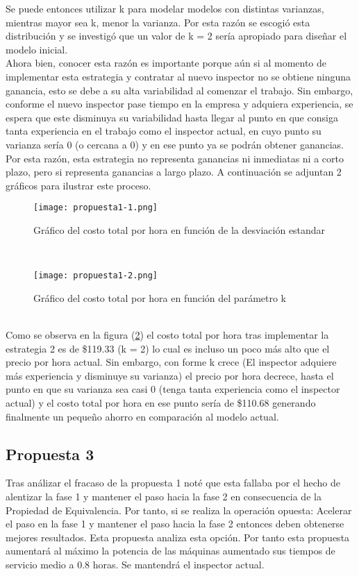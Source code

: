 \documentclass{article}
\begin{document}
Se puede entonces utilizar k para modelar modelos con distintas varianzas, mientras
mayor sea k, menor la varianza. Por esta razón se escogió esta distribución 
y se investigó que un valor de k = 2 sería apropiado para diseñar el modelo 
inicial.\\
Ahora bien, conocer esta razón es importante porque aún si al momento de implementar
esta estrategia y contratar al nuevo inspector no se obtiene ninguna ganancia, esto
se debe a su alta variabilidad al comenzar el trabajo. Sin embargo, conforme 
el nuevo inspector pase tiempo en la empresa y adquiera experiencia, se espera
que este disminuya su variabilidad hasta llegar al punto en que consiga tanta
experiencia en el trabajo como el inspector actual, en cuyo punto su varianza 
sería 0 (o cercana a 0) y en ese punto ya se podrán obtener ganancias. 
Por esta razón, esta estrategia no representa ganancias ni inmediatas ni a corto plazo,
pero si representa ganancias a largo plazo. A continuación se adjuntan 2 gráficos 
para ilustrar este proceso.\\
\begin{figure}[h]
\begin{center}
	\texttt{[image: propuesta1-1.png]}
		 \caption{Gráfico del costo total por hora en función de la desviación estandar}
\label{fig1:propuesta11}
\end{center}
\end{figure}	\\
\begin{figure}[h]
\begin{center}
	\texttt{[image: propuesta1-2.png]}
		 \caption{Gráfico del costo total por hora en función del parámetro k}
\label{fig2:propuesta12}
\end{center}
\end{figure} \\
Como se observa en la figura (\ref{fig2:propuesta12}) el costo total por hora
tras implementar la estrategia 2 es de \$119.33 (k = 2) lo cual es incluso
un poco más alto
que el precio por hora actual. Sin embargo, con forme k crece (El inspector adquiere
más experiencia y disminuye su varianza) el precio por hora decrece, hasta el 
punto en que su varianza sea casi 0 (tenga tanta experiencia como el inspector 
actual) y el costo total por hora en ese punto sería de \$110.68 generando 
finalmente un pequeño ahorro en comparación al modelo actual.
\subsection{Propuesta 3}
Tras análizar el fracaso de la propuesta 1 noté que esta fallaba por el hecho
de alentizar la fase 1 y mantener el paso hacia la fase 2 en consecuencia de la
Propiedad de Equivalencia. Por tanto, si se realiza la operación opuesta: 
Acelerar el paso en la fase 1 y mantener el paso hacia la fase 2 entonces 
deben obtenerse mejores resultados. Esta propuesta analiza esta opción.
Por tanto esta propuesta aumentará al máximo la potencia de las máquinas aumentado
sus tiempos de servicio medio a 0.8 horas. Se mantendrá el inspector actual.
\end{document}
